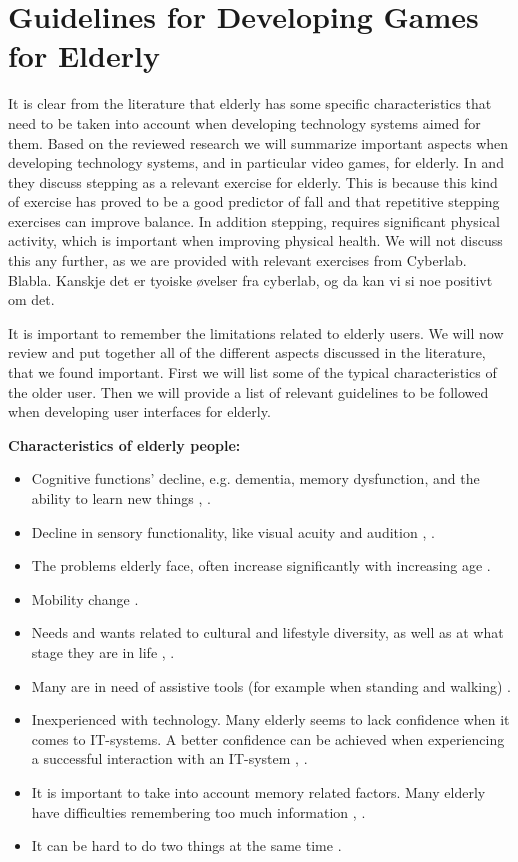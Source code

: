 \section{Guidelines for Developing Games for Elderly}
It is clear from the literature that elderly has some specific characteristics that need to be taken into account when developing technology systems aimed for them. Based on the reviewed research we will summarize important aspects when developing technology systems, and in particular video games, for elderly. In \cite{bruin} and \cite{gerling2} they discuss stepping as a relevant exercise for elderly. This is because this kind of exercise has proved to be a good predictor of fall and that repetitive stepping exercises can improve balance. In addition stepping, requires significant physical activity, which is important when improving physical health. We will not discuss this any further, as we are provided with relevant exercises from Cyberlab. Blabla. Kanskje det er tyoiske øvelser fra cyberlab, og da kan vi si noe positivt om det.

It is important to remember the limitations related to elderly users. We will now review and put together all of the different aspects discussed in the literature, that we found important. First we will list some of the typical characteristics of the older user. Then we will provide a list of relevant guidelines to be followed when developing user interfaces for elderly. 

\textbf{Characteristics of elderly people:}
\begin{itemize}
\renewcommand{\labelitemi}{$\bullet$}
\item Cognitive functions' decline, e.g. dementia, memory dysfunction, and the ability to learn new things \cite{Billis}, \cite{gregor}.
\item Decline in sensory functionality, like  visual acuity and audition \cite{Billis}, \cite{gregor}.
\item The problems elderly face, often increase significantly with increasing age \cite{gregor}.
\item Mobility change \cite{Billis}.
\item Needs and wants related to cultural and lifestyle diversity, as well as at what stage they are in life \cite{Billis}, \cite{gregor}.
\item Many are in need of assistive tools (for example when standing and walking) \cite{gregor}.
\item Inexperienced with technology. Many elderly seems to lack confidence when it comes to IT-systems. A better confidence can be achieved when experiencing a successful interaction with an IT-system \cite{Billis}, \cite{gregor}.
\item It is important to take into account memory related factors. Many elderly have difficulties remembering too much information \cite{Billis}, \cite{gregor}.
\item It can be hard to do two things at the same time \cite{bruin}.
\end{itemize}

